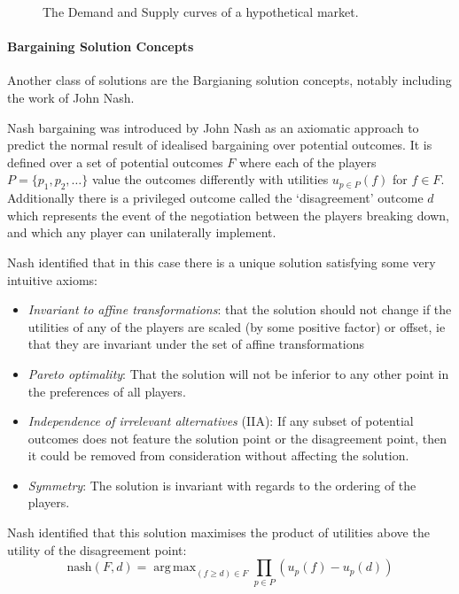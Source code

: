 \documentclass[
10pt, %
a4paper, %
oneside, %
headinclude,footinclude, %
BCOR5mm, %
]{scrartcl}
\DeclareMathOperator*{\argmax}{arg\,max}
\begin{document}
\begin{figure}[]{}
	\vspace{-10pt}
	\caption{The Demand and Supply curves of a hypothetical market.}
	
	\label{fig_demand_supply}
\end{figure}


\paragraph{Bargaining Solution Concepts}

Another class of solutions are the Bargianing solution concepts, notably including the work of John Nash.

Nash bargaining was introduced by John Nash \cite{nash1} as an axiomatic approach to predict the normal result of idealised bargaining over potential outcomes.
It is defined over a set of potential outcomes $F$ %
where each of the players $P=\{p_1,p_2,\dots\}$ value the outcomes differently with utilities $u_{p\in P}(f)$ for $f\in F$.
Additionally there is a privileged outcome called the `disagreement' outcome $d$ which represents the event of the negotiation between the players breaking down, and which any player can unilaterally implement.

Nash identified that in this case there is a unique solution satisfying some very intuitive axioms:
\begin{itemize}
\item \textit{Invariant to affine transformations}: that the solution should not change if the utilities of any of the players are scaled (by some positive factor) or offset, ie that they are invariant under the set of affine transformations%
\item \textit{Pareto optimality}: That the solution will not be inferior to any other point in the preferences of all players.
\item \textit{Independence of irrelevant alternatives} (IIA): If any subset of potential outcomes does not feature the solution point or the disagreement point, then it could be removed from consideration without affecting the solution.
\item \textit{Symmetry}: The solution is invariant with regards to the ordering of the players.
\end{itemize}
Nash identified that this solution maximises the product of utilities above the utility of the disagreement point:%
\begin{equation}\label{nash-product}\text{nash}(F,d) = \argmax_{(f\ge d)\in F}\prod_{p\in P}(u_p(f)-u_p(d))\end{equation}
\end{document}
